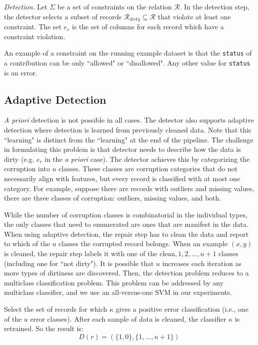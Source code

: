 \vspace{0.5em}

\emph{Detection. } Let $\Sigma$ be a set of constraints on the relation $\mathcal{R}$. 
In the detection step, the detector selects a subset of records $\mathcal{R}_{dirty} \subseteq \mathcal{R}$ that violate at least one constraint.
The set $e_r$ is the set of columns for each record which have a constraint violation. 

\begin{example}
An example of a constraint on the running example dataset is that the \texttt{status} of
a contribution can be only ``allowed" or ``disallowed".
Any other value for \texttt{status} is an error.
\end{example}

\subsection{Adaptive Detection}
\emph{A priori} detection is not possible in all cases.
The detector also supports adaptive detection where detection is learned from previously cleaned data.
Note that this ``learning" is distinct from the ``learning" at the end of the pipeline.
The challenge in formulating this problem is that detector needs to describe how the data is dirty (e.g. $e_r$ in the \emph{a priori} case).
The detector achieves this by categorizing the corruption into $u$ classes.
These classes are corruption categories that do not necessarily align with features, but every record is classified with at most one category.
For example, suppose there are records with outliers and missing values, there are three classes of corruption: outliers, missing values, and both.

While the number of corruption classes is combinatorial in the individual types, the only classes that need to enumerated are ones that are manifest in the data.
When using adaptive detection, the repair step has to clean the data and report to which of the $u$ classes the corrupted record belongs.
When an example $(x,y)$ is cleaned, the repair step labels it with one of the ${\text{clean}, 1,2,...,u+1}$ classes (including one for ``not dirty").
It is possible that $u$ increases each iteration as more types of dirtiness are discovered. 
Then, the detection problem reduces to a multiclass classification problem.
This problem can be addressed by any multiclass classifier, and we use an all-versus-one SVM in our experiments.

\begin{definition}
Select the set of records for which $\kappa$ gives a positive error classification (i.e., one of the $u$ error classes).
After each sample of data is cleaned, the classifier $\kappa$ is retrained.
So the result is:
\[D(r) = (\{1,0\},\{1,...,u+1\})\]
\end{definition}


